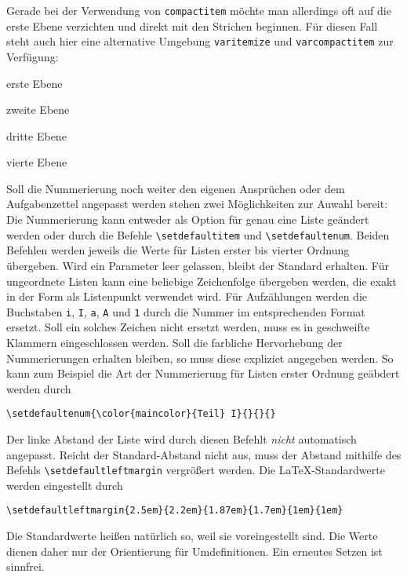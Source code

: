 \documentclass{exercise}
\begin{document}
    Gerade bei der Verwendung von \lstinline{compactitem} möchte man allerdings oft auf die erste Ebene verzichten und direkt mit den Strichen beginnen. Für diesen Fall steht auch hier eine alternative Umgebung \lstinline{varitemize} und \lstinline{varcompactitem} zur Verfügung:
    \begin{varcompactitem}
      \item erste Ebene
        \begin{compactitem}
          \item zweite Ebene
            \begin{compactitem}
              \item dritte Ebene
                \begin{compactitem}
                  \item vierte Ebene
                \end{compactitem}
            \end{compactitem}
        \end{compactitem}
    \end{varcompactitem}
    
    Soll die Nummerierung noch weiter den eigenen Ansprüchen oder dem Aufgabenzettel angepasst werden stehen zwei Möglichkeiten zur Auwahl bereit: Die Nummerierung kann entweder als Option für genau eine Liste geändert werden oder durch die Befehle \lstinline-\setdefaultitem- und \lstinline-\setdefaultenum-. Beiden Befehlen werden jeweils die Werte für Listen erster bis vierter Ordnung übergeben. Wird ein Parameter leer gelassen, bleibt der Standard erhalten. Für ungeordnete Listen kann eine beliebige Zeichenfolge übergeben werden, die exakt in der Form als Listenpunkt verwendet wird. Für Aufzählungen werden die Buchstaben \texttt{i}, \texttt{I}, \texttt{a}, \texttt{A} und \texttt{1} durch die Nummer im entsprechenden Format ersetzt. Soll ein solches Zeichen nicht ersetzt werden, muss es in geschweifte Klammern eingeschlossen werden. Soll die farbliche Hervorhebung der Nummerierungen erhalten bleiben, so muss diese expliziet angegeben werden. So kann zum Beispiel die Art der Nummerierung für Listen erster Ordnung geäbdert werden durch
    \begin{lstlisting}[gobble=6]
      \setdefaultenum{\color{maincolor}{Teil} I}{}{}{}  
    \end{lstlisting}
    Der linke Abstand der Liste wird durch diesen Befehlt \emph{nicht} automatisch angepasst. Reicht der Standard-Abstand nicht aus, muss der Abstand mithilfe des Befehls \lstinline-\setdefaultleftmargin- vergrößert werden. Die \LaTeX{}-Standardwerte werden eingestellt durch
    \begin{lstlisting}[gobble=6]
      \setdefaultleftmargin{2.5em}{2.2em}{1.87em}{1.7em}{1em}{1em}
    \end{lstlisting}
    Die Standardwerte heißen natürlich so, weil sie voreingestellt sind. Die Werte dienen daher nur der Orientierung für Umdefinitionen. Ein erneutes Setzen ist sinnfrei.
    
\end{document}
